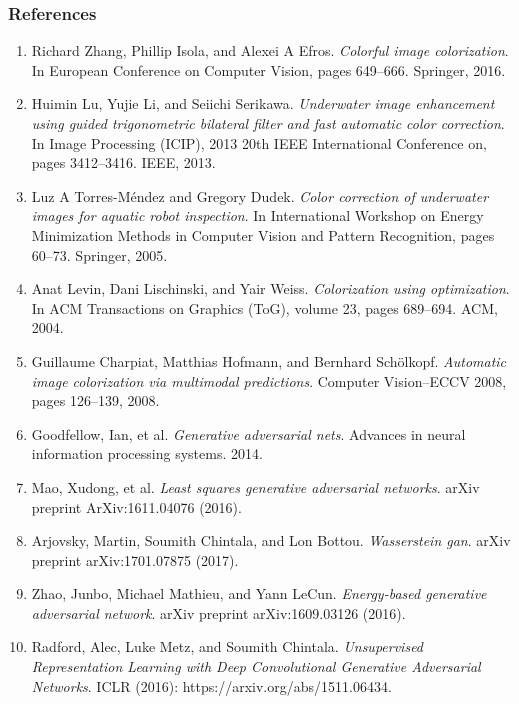 \documentclass{beamer}
\begin{document}
\begin{frame}
\frametitle{\textbf{References}}
\tiny
\begin{enumerate}
\item Richard Zhang, Phillip Isola, and Alexei A Efros. \textit{Colorful image colorization}. In European Conference on Computer Vision,
pages 649–666. Springer, 2016.
\item Huimin Lu, Yujie Li, and Seiichi Serikawa. \textit{Underwater image enhancement using guided trigonometric bilateral filter and fast
automatic color correction}. In Image Processing (ICIP), 2013 20th IEEE International Conference on, pages 3412–3416. IEEE, 2013.
\item Luz A Torres-Méndez and Gregory Dudek. \textit{Color correction of underwater images for aquatic robot inspection}. In International
Workshop on Energy Minimization Methods in Computer Vision and Pattern Recognition, pages 60–73. Springer, 2005.
\item Anat Levin, Dani Lischinski, and Yair Weiss. \textit{Colorization using optimization}. In ACM Transactions on Graphics (ToG), volume 23, pages 689–694. ACM, 2004.
\item Guillaume Charpiat, Matthias Hofmann, and Bernhard Schölkopf. \textit{Automatic image colorization via multimodal predictions}. Computer Vision–ECCV 2008, pages 126–139, 2008.
\item Goodfellow, Ian, et al. \textit{Generative adversarial nets}. Advances in neural information processing systems. 2014.
\item Mao, Xudong, et al. \textit{Least squares generative adversarial networks}. arXiv preprint ArXiv:1611.04076 (2016).
\item Arjovsky, Martin, Soumith Chintala, and Lon Bottou. \textit{Wasserstein gan}. arXiv preprint arXiv:1701.07875 (2017).
\item Zhao, Junbo, Michael Mathieu, and Yann LeCun. \textit{Energy-based generative adversarial network}. arXiv preprint arXiv:1609.03126 (2016).
\item Radford, Alec, Luke Metz, and Soumith Chintala. \textit{Unsupervised Representation Learning with Deep Convolutional Generative Adversarial Networks}. ICLR (2016): https://arxiv.org/abs/1511.06434.










\end{enumerate}
\end{frame}
\end{document}
